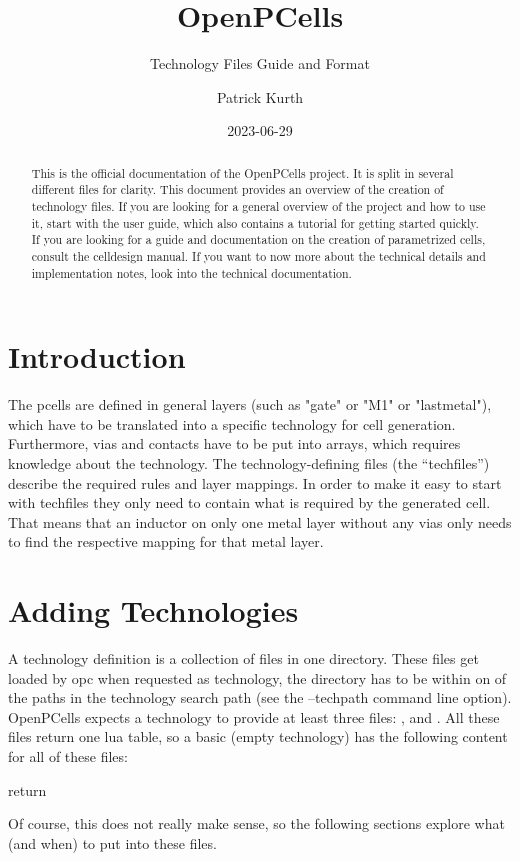 

\title{OpenPCells}
\subtitle{Technology Files Guide and Format}
\author{Patrick Kurth}
\date{2023-06-29}


\maketitle
\begin{abstract}
    \noindent This is the official documentation of the OpenPCells project. It is split in several different files for clarity. 
    This document provides an overview of the creation of technology files.
    If you are looking for a general overview of the project and how to use it, start with the user guide, which also contains a tutorial for getting started quickly. 
    If you are looking for a guide and documentation on the creation of parametrized cells, consult the celldesign manual.
    If you want to now more about the technical details and implementation notes, look into the technical documentation.
\end{abstract}

\section{Introduction}

The pcells are defined in general layers (such as "gate" or "M1" or "lastmetal"), which have to be translated into a specific technology for cell generation.
Furthermore, vias and contacts have to be put into arrays, which requires knowledge about the technology.
The technology-defining files (the \enquote{techfiles}) describe the required rules and layer mappings.
In order to make it easy to start with techfiles they only need to contain what is required by the generated cell.
That means that an inductor on only one metal layer without any vias only needs to find the respective mapping for that metal layer.

\section{Adding Technologies}
A technology definition is a collection of files in one directory.
These files get loaded by opc when requested as technology, the directory has to be within on of the paths in the technology search path (see the --techpath command line option).
OpenPCells expects a technology to provide at least three files: ,  and .
All these files return one lua table, so a basic (empty technology) has the following content for all of these files:
\begin{lualisting}
    return {}
\end{lualisting}
Of course, this does not really make sense, so the following sections explore what (and when) to put into these files.

